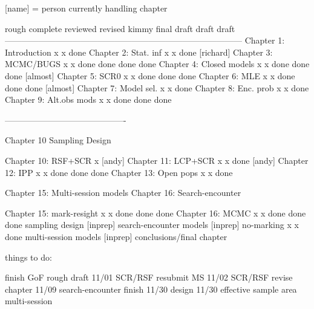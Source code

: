 [name] = person currently handling chapter


                          rough   complete reviewed  revised kimmy final 
                          draft    draft                           draft
------------------------------------------------------------------------------------
Chapter 1: Introduction       x       x     done    
Chapter 2: Stat. inf          x       x     done    [richard]
Chapter 3: MCMC/BUGS          x       x     done     done    done   done
Chapter 4: Closed models      x       x     done     done    done   [almost]
Chapter 5: SCR0               x       x     done     done    done
Chapter 6: MLE                x       x     done     done    done   [almost]
Chapter 7: Model sel.         x       x     done   
Chapter 8: Enc. prob          x       x     done
Chapter 9: Alt.obs mods       x       x     done     done    done

-------------------------------------------

Chapter 10 Sampling Design

Chapter 10: RSF+SCR           x    [andy]
Chapter 11: LCP+SCR           x       x     done    [andy]
Chapter 12: IPP               x       x     done     done           done
Chapter 13: Open pops         x       x     done 

Chapter 15: Multi-session models
Chapter 16: Search-encounter

Chapter 15: mark-resight      x       x     done     done           done
Chapter 16: MCMC              x       x     done     done           done
sampling design            [inprep]
search-encounter models    [inprep]
no-marking                    x       x     done
multi-session models       [inprep]
conclusions/final chapter





things to do:

finish GoF rough draft   11/01
SCR/RSF resubmit MS      11/02
SCR/RSF revise chapter   11/09
search-encounter finish  11/30
design                   11/30
effective sample area  
multi-session
